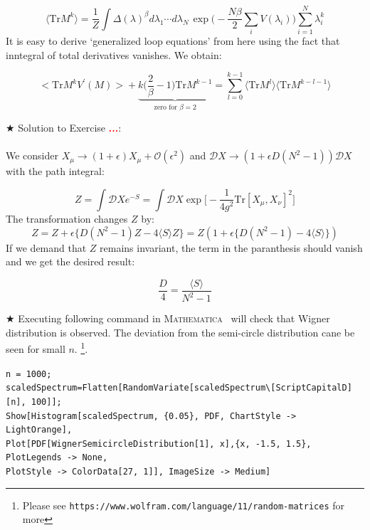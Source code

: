 \documentclass[11pt]{article}
\newcommand{\TODO}[1]{\textcolor{red}{{\bf #1}}}
\newcommand{\MA}{\textsc{Mathematica}}
\begin{document}
\begin{equation} 
\langle \mbox{Tr} M^k  \rangle = \frac{1}{Z} \int \Delta(\lambda)^{\beta} 
	d\lambda_1 \cdots d\lambda_{N~} \exp\Bigg(-\frac{N\beta}{2} \sum_{i} V(\lambda_{i})\Bigg)  \sum_{i=1}^{N} \lambda_{i}^k
\end{equation}
It is easy to derive `generalized loop equations' from here using the fact that inntegral of total derivatives vanishes. We obtain:

\begin{equation}
		\Big< \mathrm{Tr} M^{k} V^{\prime}(M) \Big> +  \underbrace{k \Bigg(\frac{2}{\beta} - 1 \Bigg) \mathrm{Tr} M^{k-1}}_{\text{zero for $\beta=2$}} = \sum_{l=0}^{k-1} \langle \mathrm{Tr} M^{l} \rangle  \langle \mathrm{Tr} M^{k-l-1} \rangle
\end{equation}
 

\noindent $\bigstar$ Solution to Exercise \TODO{...}: 
\\ \\ 
We consider $ X_{\mu} \to (1 + \epsilon) X_{\mu} + \mathcal{O}(\epsilon^2)$
and $\mathcal{D}X \to (1 + \epsilon D (N^2-1))\mathcal{D}X$ with the path integral:

\begin{equation}
Z = \int \mathcal{D}X e^{-S} = \int \mathcal{D}X \exp\Big[-\frac{1}{4g^2} \mbox{Tr} [X_\mu,X_\nu]^2\Big]
\end{equation}
The transformation changes $Z$ by:
\begin{equation}
	Z = Z + \epsilon \Big\{ D(N^2 -1)Z - 4\langle S \rangle Z  \Big\} = Z ( 1 + \epsilon \Big\{ D(N^2 -1) - 4\langle S \rangle   \Big\})
\end{equation}
If we demand that $Z$ remains invariant, the term in the paranthesis should vanish and we get the desired result:

\begin{equation}
	\frac{D}{4} = \frac{\langle S \rangle}{N^2 - 1 }
\end{equation}



\noindent $\bigstar$ Executing following command in \MA~ will check that Wigner distribution is 
observed. The deviation from the semi-circle distribution cane be seen for small 
$n$. \footnote{Please see \texttt{https://www.wolfram.com/language/11/random-matrices} for more}.  

\begin{mdframed}[backgroundcolor=magenta!3]
	\begin{footnotesize} 
		\verb"n = 1000;"\\ 
		\verb"scaledSpectrum=Flatten[RandomVariate[scaledSpectrum\[ScriptCapitalD][n], 100]];"\\
		\verb"Show[Histogram[scaledSpectrum, {0.05}, PDF, ChartStyle -> LightOrange], "  \\ 
		\verb"Plot[PDF[WignerSemicircleDistribution[1], x],{x, -1.5, 1.5}, PlotLegends -> None, " \\
		\verb"PlotStyle -> ColorData[27, 1]], ImageSize -> Medium]"
	\end{footnotesize} 
\end{mdframed}
\end{document}
